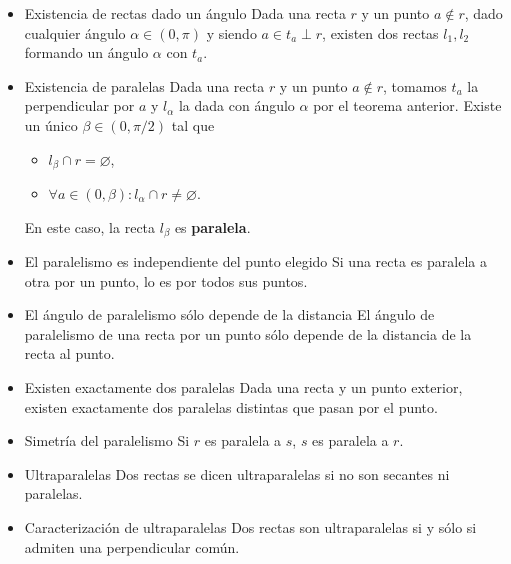 \documentclass[11pt]{article}
\begin{document}
\begin{itemize}
\item Existencia de rectas dado un ángulo
\label{sec-5-2-3-1}
Dada una recta $r$ y un punto $a \notin r$, dado cualquier ángulo $\alpha \in (0,\pi)$ y
siendo $a \in t_a \perp r$, existen dos rectas $l_1,l_2$ formando un ángulo $\alpha$ con
$t_a$.

\item Existencia de paralelas
\label{sec-5-2-3-2}
Dada una recta $r$ y un punto $a \notin r$, tomamos $t_{a}$ la perpendicular por $a$
y $l_{\alpha}$ la dada con ángulo $\alpha$ por el teorema anterior. Existe un único
$\beta \in (0,\pi/2)$ tal que

\begin{itemize}
\item $l_{\beta}\cap r = \varnothing$,
\item $\forall a \in (0,\beta): l_{\alpha}\cap r \neq \varnothing$.
\end{itemize}

En este caso, la recta $l_{\beta}$ es \textbf{paralela}.

\item El paralelismo es independiente del punto elegido
\label{sec-5-2-3-3}
Si una recta es paralela a otra por un punto, lo es por todos sus
puntos.

\item El ángulo de paralelismo sólo depende de la distancia
\label{sec-5-2-3-4}
El ángulo de paralelismo de una recta por un punto sólo depende de
la distancia de la recta al punto.

\item Existen exactamente dos paralelas
\label{sec-5-2-3-5}
Dada una recta y un punto exterior, existen exactamente dos paralelas
distintas que pasan por el punto.

\item Simetría del paralelismo
\label{sec-5-2-3-6}
Si $r$ es paralela a $s$, $s$ es paralela a $r$.

\item Ultraparalelas
\label{sec-5-2-3-7}
Dos rectas se dicen ultraparalelas si no son secantes ni paralelas.

\item Caracterización de ultraparalelas
\label{sec-5-2-3-8}
Dos rectas son ultraparalelas si y sólo si admiten una perpendicular
común.
\end{itemize}
\end{document}
